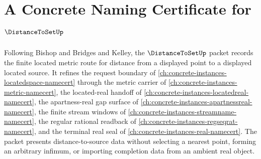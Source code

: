 \chapter{A Concrete Naming Certificate for $\DistanceToSetUp$}
\label{ch:concrete-instances-distance-to-set-namecert}

Following Bishop and Bridges and Kelley, the $\DistanceToSetUp$ packet records the finite located metric route for distance from a displayed point to a displayed located source. It refines the request boundary of \autoref{ch:concrete-instances-locatedspace-namecert} through the metric carrier of \autoref{ch:concrete-instances-metric-namecert}, the located-real handoff of \autoref{ch:concrete-instances-locatedreal-namecert}, the apartness-real gap surface of \autoref{ch:concrete-instances-apartnessreal-namecert}, the finite stream windows of \autoref{ch:concrete-instances-streamname-namecert}, the regular rational readback of \autoref{ch:concrete-instances-regseqrat-namecert}, and the terminal real seal of \autoref{ch:concrete-instances-real-namecert}. The packet presents distance-to-source data without selecting a nearest point, forming an arbitrary infimum, or importing completion data from an ambient real object.

